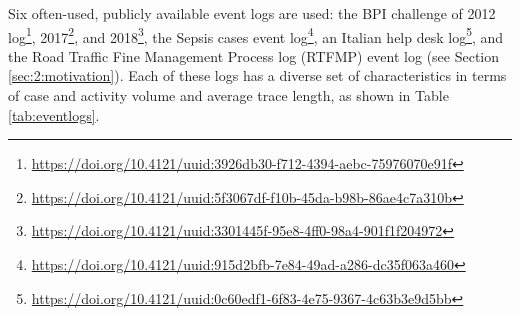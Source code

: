 Six often-used, publicly available event logs are used: the BPI challenge of 2012 log\footnote{\url{https://doi.org/10.4121/uuid:3926db30-f712-4394-aebc-75976070e91f}}, 2017\footnote{\url{https://doi.org/10.4121/uuid:5f3067df-f10b-45da-b98b-86ae4c7a310b}}, and 2018\footnote{\url{https://doi.org/10.4121/uuid:3301445f-95e8-4ff0-98a4-901f1f204972}}, the Sepsis cases event log\footnote{\url{https://doi.org/10.4121/uuid:915d2bfb-7e84-49ad-a286-dc35f063a460}}, an Italian help desk log\footnote{\url{https://doi.org/10.4121/uuid:0c60edf1-6f83-4e75-9367-4c63b3e9d5bb}}, and the Road Traffic Fine Management Process log (RTFMP) event log (see Section \ref{sec:2:motivation}).
Each of these logs has a diverse set of characteristics in terms of case and activity volume and average trace length, as shown in Table \ref{tab:eventlogs}.
\begin{table}[htbp]
  \centering
  \caption{Overview of the characteristics of the event logs used in the evaluation.}
  \label{tab:eventlogs}%
\end{table}%

